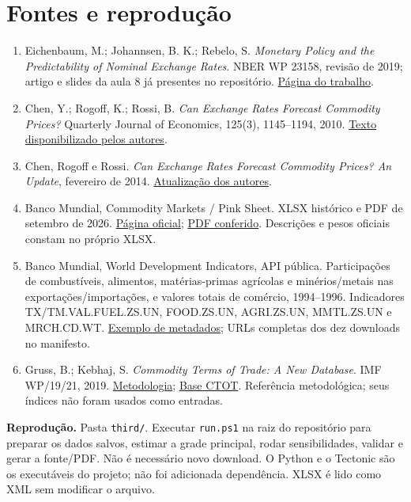 \documentclass[11pt,a4paper]{article}
\begin{document}
\section*{Fontes e reprodução}
\begin{enumerate}[leftmargin=1.7em,itemsep=7pt]
\item Eichenbaum, M.; Johannsen, B. K.; Rebelo, S. \emph{Monetary Policy and the Predictability of Nominal Exchange Rates}. NBER WP 23158, revisão de 2019; artigo e slides da aula 8 já presentes no repositório. \href{https://www.nber.org/papers/w23158}{Página do trabalho}.
\item Chen, Y.; Rogoff, K.; Rossi, B. \emph{Can Exchange Rates Forecast Commodity Prices?} Quarterly Journal of Economics, 125(3), 1145--1194, 2010. \href{https://scholar.harvard.edu/sites/scholar.harvard.edu/files/rogoff/files/125-3-1145.pdf}{Texto disponibilizado pelos autores}.
\item Chen, Rogoff e Rossi. \emph{Can Exchange Rates Forecast Commodity Prices? An Update}, fevereiro de 2014. \href{https://scholar.harvard.edu/files/rogoff/files/crr2014a.pdf}{Atualização dos autores}.
\item Banco Mundial, Commodity Markets / Pink Sheet. XLSX histórico e PDF de setembro de 2026. \href{https://www.worldbank.org/en/research/commodity-markets}{Página oficial}; \href{https://thedocs.worldbank.org/en/doc/74e8be41ceb20fa0da750cda2f6b9e4e-0050012026/related/CMO-Pink-Sheet-September-2026.pdf}{PDF conferido}. Descrições e pesos oficiais constam no próprio XLSX.
\item Banco Mundial, World Development Indicators, API pública. Participações de combustíveis, alimentos, matérias-primas agrícolas e minérios/metais nas exportações/importações, e valores totais de comércio, 1994--1996. Indicadores TX/TM.VAL.FUEL.ZS.UN, FOOD.ZS.UN, AGRI.ZS.UN, MMTL.ZS.UN e MRCH.CD.WT. \href{https://api.worldbank.org/v2/indicator/TX.VAL.FUEL.ZS.UN?format=json}{Exemplo de metadados}; URLs completas dos dez downloads no manifesto.
\item Gruss, B.; Kebhaj, S. \emph{Commodity Terms of Trade: A New Database}. IMF WP/19/21, 2019. \href{https://www.imf.org/-/media/files/publications/wp/2019/wp1921.pdf}{Metodologia}; \href{https://data.imf.org/en/datasets/IMF.RES:CTOT}{Base CTOT}. Referência metodológica; seus índices não foram usados como entradas.
\end{enumerate}

\textbf{Reprodução.} Pasta \texttt{third/}. Executar \texttt{run.ps1} na raiz do repositório para preparar os dados salvos, estimar a grade principal, rodar sensibilidades, validar e gerar a fonte/PDF. Não é necessário novo download. O Python e o Tectonic são os executáveis do projeto; não foi adicionada dependência. XLSX é lido como XML sem modificar o arquivo.
\end{document}
